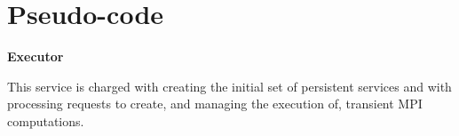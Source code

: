 \documentclass[10pt]{article}
\begin{document}

\section{Pseudo-code}

\vspace{3ex}
\noindent
\textbf{Executor}

\noindent
This service is charged with creating the initial set of persistent services and with processing requests to create, and managing the execution of, transient MPI computations.
\end{document}

